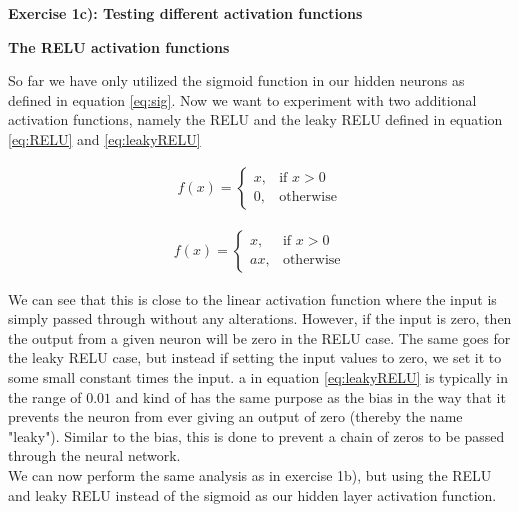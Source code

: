 \documentclass[12pt,a4paper]{article}
\begin{document}
\newpage

\begin{center}
\Large{\textbf{Exercise 1c): Testing different activation functions}}
\end{center}

\begin{center}
\large{\textbf{The RELU activation functions}}
\end{center}

\noindent So far we have only utilized the sigmoid function in our hidden neurons as defined in equation \ref{eq:sig}. Now we want to experiment with two additional activation functions, namely the RELU and the leaky RELU defined in equation \ref{eq:RELU} and \ref{eq:leakyRELU}

\begin{equation}\label{eq:RELU}
\begin{aligned}
f(x) = 
\begin{cases}
x,& \text{if } x > 0\\
0,& \text{otherwise}
\end{cases}
\end{aligned}
\end{equation}

\begin{equation}\label{eq:leakyRELU}
\begin{aligned}
f(x) = 
\begin{cases}
x,& \text{if } x > 0\\
ax,& \text{otherwise}
\end{cases}
\end{aligned}
\end{equation}

\noindent We can see that this is close to the linear activation function where the input is simply passed through without any alterations. However, if the input is zero, then the output from a given neuron will be zero in the RELU case. The same goes for the leaky RELU case, but instead if setting the input values to zero, we set it to some small constant times the input. a in equation \ref{eq:leakyRELU} is typically in the range of $0.01$ and kind of has the same purpose as the bias in the way that it prevents the neuron from ever giving an output of zero (thereby the name "leaky"). Similar to the bias, this is done to prevent a chain of zeros to be passed through the neural network.
\\
We can now perform the same analysis as in exercise 1b), but using the RELU and leaky RELU instead of the sigmoid as our hidden layer activation function.
\end{document}
